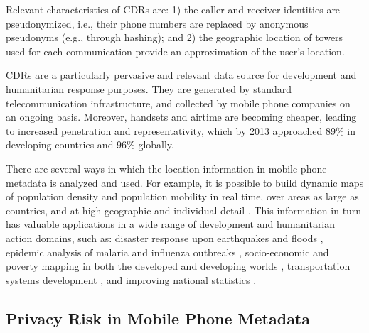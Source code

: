 \documentclass[12pt]{article}
\begin{document}
Relevant characteristics of CDRs are: 1) the caller and receiver identities are pseudonymized, i.e., their phone numbers are replaced by anonymous pseudonyms (e.g., through hashing); and 2) the geographic location of towers used for each communication provide an approximation of the user's location. 

CDRs are a particularly pervasive and relevant data source for development and humanitarian response purposes. They are generated by standard telecommunication infrastructure, and collected by mobile phone companies on an ongoing basis. Moreover, handsets and airtime are becoming cheaper, leading to increased penetration and representativity, which by 2013 approached 89\% in developing countries and 96\% globally\cite{UNmobile2013}. 

There are several ways in which the location information in mobile phone metadata is analyzed and used. For example, it is possible to build dynamic maps of population density and population mobility in real time, over areas as large as countries, and at high geographic and individual detail \cite{deville2014dynamic}. This information in turn has valuable applications in a wide range of development and humanitarian action domains, such as: disaster response upon earthquakes and floods \cite{bengtsson2011improved,cdrs-tabasco}, epidemic analysis of malaria and influenza outbreaks \cite{wesolowski2012quantifying,frias2011agent}, socio-economic and poverty mapping in both the developed and developing worlds \cite{eagle2010network,blumenstock2015predicting,steele2017mapping}, transportation systems development \cite{berlingerio2013allaboard}, and improving national statistics \cite{jahani2017improving}.


\subsection{\textbf{Privacy Risk in Mobile Phone Metadata}}
\vspace{5pt}

\iffalse Psuedonoymized metadata, and CDRs in particular, is metadata in which all personal information such as names, addresses and telephone numbers are replaced with unique and anonymous identifiers (see caller IDs in Table~\ref{tab:cdr}). This means that the sequence of records of an individual user continue to be associated with one another (e.g., first two records in Table \ref{tab:cdr}), but no explicit connection can be made between the sequence of records and the actual identity of the individual.\fi
\end{document}
